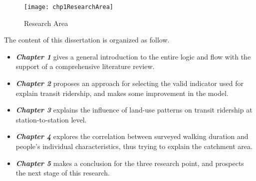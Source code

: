 \begin{figure}[htbp]
	\centering
	\texttt{[image: chp1ResearchArea]}
	\caption{Research Area}
	\label{fig:chp1:ResearchArea}
\end{figure}

The content of this dissertation is organized as follow.

\begin{itemize}
	\item \emph{\textbf{Chapter 1}} gives a general introduction to the entire logic and flow with the support of a comprehensive literature review.
	\item \emph{\textbf{Chapter 2}} proposes an approach for selecting the valid indicator used for explain transit ridership, and makes some improvement in the model.
	\item \emph{\textbf{Chapter 3}} explains the influence of land-use patterns on transit ridership at station-to-station level.
	\item \emph{\textbf{Chapter 4}} explores the correlation between surveyed walking duration and people's individual characteristics, thus trying to explain the catchment area.
	\item \emph{\textbf{Chapter 5}} makes a conclusion for the three research point, and prospects the next stage of this research.
\end{itemize}

\clearpage %
% 

